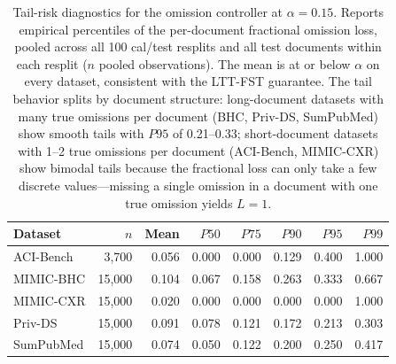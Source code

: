 \begin{table}[h]
\centering
\small
\caption{Tail-risk diagnostics for the omission controller at $\alpha = 0.15$. Reports empirical percentiles of the per-document fractional omission loss, pooled across all 100 cal/test resplits and all test documents within each resplit (\emph{$n$} pooled observations). The mean is at or below $\alpha$ on every dataset, consistent with the LTT-FST guarantee. The tail behavior splits by document structure: long-document datasets with many true omissions per document (BHC, Priv-DS, SumPubMed) show smooth tails with $P95$ of 0.21--0.33; short-document datasets with 1--2 true omissions per document (ACI-Bench, MIMIC-CXR) show bimodal tails because the fractional loss can only take a few discrete values---missing a single omission in a document with one true omission yields $L = 1$.}
\label{tab:tail-risk}
\begin{tabular}{l r r r r r r r}
\toprule
Dataset & $n$ & Mean & $P50$ & $P75$ & $P90$ & $P95$ & $P99$ \\
\midrule
  ACI-Bench & 3,700 & 0.056 & 0.000 & 0.000 & 0.129 & 0.400 & 1.000 \\
  MIMIC-BHC & 15,000 & 0.104 & 0.067 & 0.158 & 0.263 & 0.333 & 0.667 \\
  MIMIC-CXR & 15,000 & 0.020 & 0.000 & 0.000 & 0.000 & 0.000 & 1.000 \\
  Priv-DS & 15,000 & 0.091 & 0.078 & 0.121 & 0.172 & 0.213 & 0.303 \\
  SumPubMed & 15,000 & 0.074 & 0.050 & 0.122 & 0.200 & 0.250 & 0.417 \\
\bottomrule
\end{tabular}
\end{table}